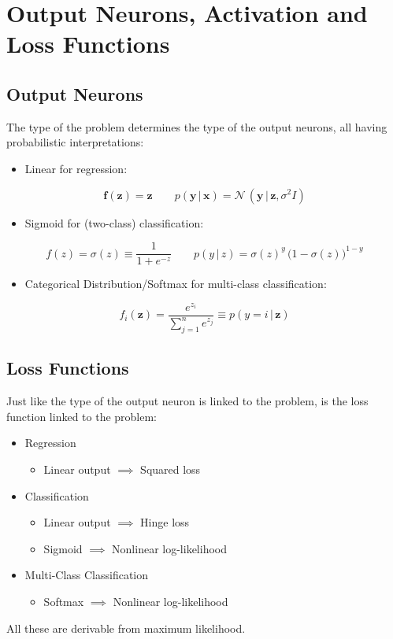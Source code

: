 \documentclass[a4paper, 11pt, accentcolor = tud3b]{tudreport}
\newcommand{\given}{\ensuremath{\,\vert\,}}
\renewcommand{\vec}[1]{\mathbf{#1}}
\begin{document}
		\section{Output Neurons, Activation and Loss Functions}
			\subsection{Output Neurons}
				The type of the problem determines the type of the output neurons, all having probabilistic interpretations:
				\begin{itemize}
					\item Linear for regression:
				\end{itemize}
				\begin{equation}
					\vec{f}(\vec{z}) = \vec{z} \qquad p(\vec{y} \given \vec{x}) = \mathcal{N}\,(\vec{y} \given \vec{z}, \sigma^2 I)
				\end{equation}
				\begin{itemize}
					\item Sigmoid for (two-class) classification:
				\end{itemize}
				\begin{equation}
					f(z) = \sigma(z) \equiv \frac{1}{1 + e^{-z}} \qquad p(y \given z) = \sigma(z)^y \, \big( 1 - \sigma(z) \big)^{1 - y}
				\end{equation}
				\begin{itemize}
					\item Categorical Distribution/Softmax for multi-class classification:
				\end{itemize}
				\begin{equation}
					f_i(\vec{z}) = \frac{e^{z_i}}{\sum_{j = 1}^{n} e^{z_j}} \equiv p(y = i \given \vec{z})
				\end{equation}

			\subsection{Loss Functions}
				Just like the type of the output neuron is linked to the problem, is the loss function linked to the problem:
				\begin{itemize}
					\item Regression
						\begin{itemize}
							\item Linear output \(\implies\) Squared loss
						\end{itemize}
					\item Classification
						\begin{itemize}
							\item Linear output \(\implies\) Hinge loss
							\item Sigmoid \(\implies\) Nonlinear log-likelihood
						\end{itemize}
					\item Multi-Class Classification
						\begin{itemize}
							\item Softmax \(\implies\) Nonlinear log-likelihood
						\end{itemize}
				\end{itemize}
				All these are derivable from maximum likelihood.
\end{document}
